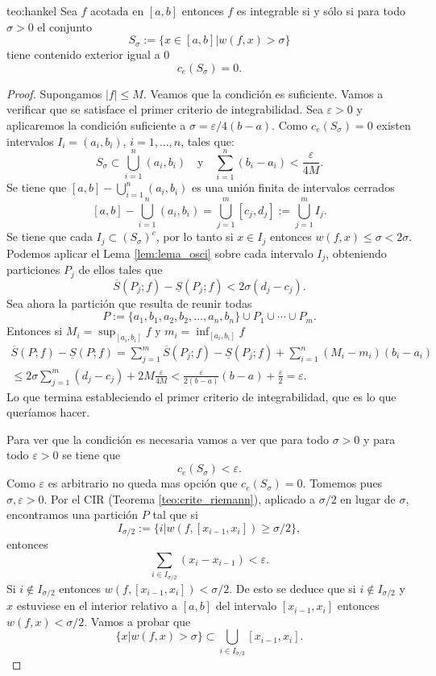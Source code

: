 
 \begin{teorema}{teo:hankel}  Sea $f$ acotada en $[a,b]$ entonces $f$ es integrable si y sólo si para todo $\sigma>0$ el conjunto 
 $$S_{\sigma}:=\{x\in [a,b]| w(f,x)>\sigma\}$$ 
 tiene contenido exterior igual a $0$ 
 $$c_e(S_{\sigma})=0.$$
   \end{teorema}
\begin{proof}  Supongamos $|f|\leq M$. Veamos que la condición es suficiente. Vamos a verificar que se satisface el primer criterio de integrabilidad. Sea $\varepsilon>0$ y aplicaremos la condición suficiente a $\sigma=\varepsilon/4(b-a)$. Como $c_e(S_\sigma)=0$ existen intervalos $I_i=(a_i,b_i)$, $i=1,\ldots,n$, tales que:
$$S_\sigma\subset \bigcup_{i=1}^n(a_i,b_i)\quad\text{y}\quad \sum_{i=1}^n(b_i-a_i)<\frac{\varepsilon}{4M}.$$ 
 Se tiene que $[a,b]-\bigcup_{i=1}^n(a_i,b_i)$ es una unión finita de intervalos cerrados
 \[
  [a,b]-\bigcup_{i=1}^n(a_i,b_i)= \bigcup_{j=1}^m [c_j,d_j]:= \bigcup_{j=1}^m I_j.
 \]
Se tiene que cada $I_j\subset \left(S_\sigma\right)^c$, por lo tanto si $x\in I_j$ entonces $w(f,x)\leq \sigma<2\sigma$. Podemos aplicar el Lema \ref{lem:lema_osci} sobre cada intervalo $I_j$, obteniendo particiones $P_j$ de ellos tales que
 \[ \overline{S}(P_j;f)-\underline{S}(P_j;f)<2\sigma(d_j-c_j).\]
 Sea ahora la partición que resulta de reunir todas 
 \[
  P:=\{a_1,b_1,a_2,b_2,\ldots,a_n,b_n\}\cup P_1\cup\cdots\cup P_m.
 \]
Entonces si $M_i=\sup_{[a_i,b_i]}f$ y $m_i=\inf_{[a_i,b_i]}f$
\begin{multline*}
  \overline{S}(P;f)-\underline{S}(P;f)=\sum_{j=1}^m \overline{S}(P_j;f)-\underline{S}(P_j;f)+\sum_{i=1}^n(M_i-m_i)(b_i-a_i)\\
  \leq 2\sigma\sum_{j=1}^m(d_j-c_j)+2M\frac{\varepsilon}{4M}<\frac{\varepsilon}{2(b-a)}(b-a)+\frac{\varepsilon}{2}=\varepsilon.
\end{multline*}
Lo que termina estableciendo el primer criterio de integrabilidad, que es lo que queríamos hacer.

Para ver que la condición es necesaria vamos a ver que para todo $\sigma>0$ y para todo $\varepsilon>0$ se tiene que 
\begin{equation}\label{eq:hankel_final}
 c_e(S_\sigma)<\varepsilon.
\end{equation}
Como $\varepsilon$ es arbitrario no queda mas opción que $c_e(S_\sigma)=0$. Tomemos pues $\sigma,\varepsilon>0$. Por el CIR (Teorema \ref{teo:crite_riemann}), aplicado a $\sigma/2$ en lugar de $\sigma$, encontramos una partición $P$ tal que si 
\[
 I_{\sigma/2}:=\{i|w(f,[x_{i-1},x_i])\geq\sigma/2\},
\] 
entonces
\[
 \sum_{i\in I_{\sigma/2}}(x_i-x_{i-1})<\varepsilon.
\]
Si $i\notin I_{\sigma/2}$ entonces $w(f,[x_{i-1},x_i])<\sigma/2$. De esto se deduce que  si $i\notin I_{\sigma/2}$ y $x$ estuviese en el interior relativo a $[a,b]$ del intervalo $[x_{i-1},x_i]$ entonces $w(f,x)<\sigma/2$. Vamos a probar que
\begin{equation}\label{eq:hankel_conj=}
 \{x| w(f,x)>\sigma\}\subset \bigcup_{i\in I_{\sigma/2}}[x_{i-1},x_i].
\end{equation}


\end{proof}
